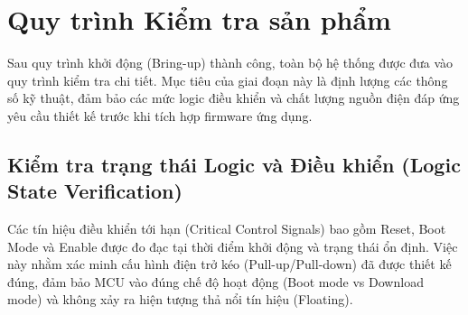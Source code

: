 \section{Quy trình Kiểm tra sản phẩm}

    Sau quy trình khởi động (Bring-up) thành công, toàn bộ hệ thống được đưa vào quy trình kiểm tra chi tiết. Mục tiêu của giai đoạn này là định lượng các thông số kỹ thuật, đảm bảo các mức logic điều khiển và chất lượng nguồn điện đáp ứng yêu cầu thiết kế trước khi tích hợp firmware ứng dụng.

    \subsection{Kiểm tra trạng thái Logic và Điều khiển (Logic State Verification)}
        Các tín hiệu điều khiển tới hạn (Critical Control Signals) bao gồm Reset, Boot Mode và Enable được đo đạc tại thời điểm khởi động và trạng thái ổn định. Việc này nhằm xác minh cấu hình điện trở kéo (Pull-up/Pull-down) đã được thiết kế đúng, đảm bảo MCU vào đúng chế độ hoạt động (Boot mode vs Download mode) và không xảy ra hiện tượng thả nổi tín hiệu (Floating).

